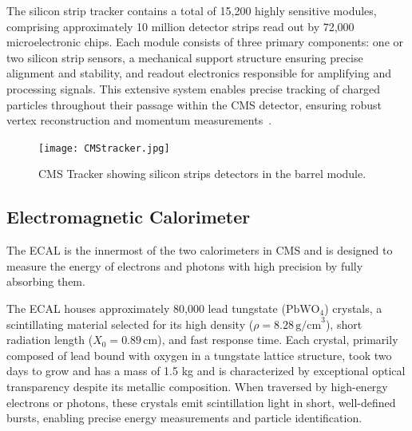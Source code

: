 The silicon strip tracker contains a total of 15,200 highly sensitive modules, comprising approximately 10 million detector strips read out by 72,000 microelectronic chips. Each module consists of three primary components: one or two silicon strip sensors, a mechanical support structure ensuring precise alignment and stability, and readout electronics responsible for amplifying and processing signals. This extensive system enables precise tracking of charged particles throughout their passage within the CMS detector, ensuring robust vertex reconstruction and momentum measurements~\cite{CMS:trackingPerf}.




\begin{figure}[!ht]
    \begin{center}
        \texttt{[image: CMStracker.jpg]}
        \caption{CMS Tracker showing silicon strips detectors in the barrel module.}
        \label{fig:CMStracker}
    \end{center}
\end{figure}

\subsection{Electromagnetic Calorimeter}

The ECAL is the innermost of the two calorimeters in CMS and is designed to measure the energy of electrons and photons with high precision by fully absorbing them.

The ECAL houses approximately 80,000 lead tungstate (\(\text{PbWO}_4\)) crystals, a scintillating material selected for its high density (\(\rho = 8.28 \, \text{g/cm}^3\)), short radiation length (\(X_0 = 0.89 \, \text{cm}\)), and fast response time. Each crystal, primarily composed of lead bound with oxygen in a tungstate lattice structure, took two days to grow and has a mass of 1.5 kg and is characterized by exceptional optical transparency despite its metallic composition. When traversed by high-energy electrons or photons, these crystals emit scintillation light in short, well-defined bursts, enabling precise energy measurements and particle identification.

